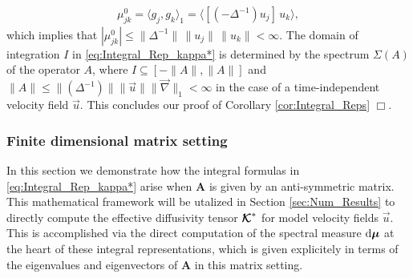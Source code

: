 \documentclass[11pt]{amsart}
\renewcommand{\d}{\mathrm{d}}
\newcommand{\Ab}{\mathbf{A}}
\newcommand{\Qb}{\mathbf{Q}}
\newcommand\Kbc{\mbox{\boldmath${\mathcal{K}}$}}
\newcommand\bmu{\mbox{\boldmath${\mu}$}}
\begin{document}
% 
\begin{align}\label{eq:Mass_Scalar}
  \mu^0_{jk}
        =\langle g_j,g_k\rangle_1
        =\langle[(-\Delta^{-1})u_j]\,u_k\rangle,   
\end{align}
%
which implies that
$|\mu^0_{jk}|\leq\|\Delta^{-1}\|\,\|u_j\|\,\|u_k\|<\infty$.  The
domain of integration $I$ in \eqref{eq:Integral_Rep_kappa*} is
determined by the spectrum $\Sigma(A)$ of the operator $A$, where
$I\subseteq[-\|A\|,\|A\|]$ and $\|A\|\leq\|(\Delta^{-1})\|\|\vec{u}\|\|\vec{\nabla}\|_1<\infty$ in the case of a
time-independent velocity field $\vec{u}$. This concludes our proof of
Corollary \ref{cor:Integral_Reps} $\Box$.  


\subsubsection{Finite dimensional matrix
  setting}\label{sec:Integral_Rep_Matrix} 
%
In this section we demonstrate how the integral formulas in
\eqref{eq:Integral_Rep_kappa*} arise when $\Ab$ is given by an
anti-symmetric matrix. This mathematical framework will be utalized in
Section \ref{sec:Num_Results} to directly compute the effective
diffusivity tensor $\Kbc^*$ for model velocity fields $\vec{u}$. This
is accomplished via the direct computation of the spectral measure
$\d\bmu$ at the heart of these integral representations, which is
given explicitely in terms of the eigenvalues and eigenvectors of
$\Ab$ in this matrix setting.  
\end{document}
